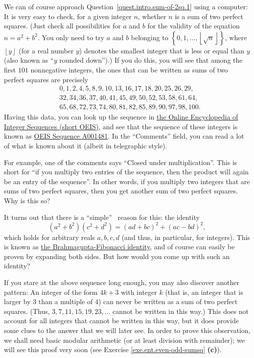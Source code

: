 \documentclass[numbers=enddot,12pt,final,onecolumn,notitlepage]{scrartcl}%
\numberwithin{exer}{subsection}
\theoremstyle{definition}
\begin{document}
We can of course approach Question~\ref{quest.intro.sum-of-2sq.1} using a
computer: It is very easy to check, for a given integer $n$, whether $n$ is a
sum of two perfect squares. (Just check all possibilities for $a$ and $b$ for
the validity of the equation $n = a^{2} + b^{2}$. You only need to try $a$ and
$b$ belonging to $\left\{  0, 1, \ldots, \left\lfloor \sqrt{n} \right\rfloor
\right\}  $, where $\left\lfloor y \right\rfloor $ (for a real number $y$)
denotes the smallest integer that is less or equal than $y$ (also known as
``$y$ rounded down'').) If you do this, you will see that among the first
$101$ nonnegative integers, the ones that can be written as sums of two
perfect squares are precisely
\begin{align*}
&  0, 1, 2, 4, 5, 8, 9, 10, 13, 16, 17, 18, 20, 25, 26, 29,\\
&  32, 34, 36, 37, 40, 41, 45, 49, 50, 52, 53, 58, 61, 64,\\
&  65, 68, 72, 73, 74, 80, 81, 82, 85, 89, 90, 97, 98, 100 .
\end{align*}
Having this data, you can look up the sequence in \href{https://oeis.org/}{the
Online Encyclopedia of Integer Sequences (short OEIS)}, and see that the
sequence of these integers is known as \href{https://oeis.org/A001481}{OEIS
Sequence A001481}. In the ``Comments'' field, you can read a lot of what is
known about it (albeit in telegraphic style).

For example, one of the comments says ``Closed under multiplication''. This is
short for ``if you multiply two entries of the sequence, then the product will
again be an entry of the sequence''. In other words, if you multiply two
integers that are sums of two perfect squares, then you get another sum of two
perfect squares. Why is this so?

It turns out that there is a \textquotedblleft simple\textquotedblright%
\ reason for this: the identity
\begin{equation}
\left(  a^{2}+b^{2}\right)  \left(  c^{2}+d^{2}\right)  =\left(  ad+bc\right)
^{2}+\left(  ac-bd\right)  ^{2}, \label{eq.intro.sum-of-2sq.sum*sum}%
\end{equation}
which holds for arbitrary reals $a,b,c,d$ (and thus, in particular, for
integers). This is known as
\href{https://en.wikipedia.org/wiki/Brahmagupta-Fibonacci_identity}{the
Brahmagupta-Fibonacci identity}, and of course can easily be proven by
expanding both sides. But how would you come up with such an identity?

If you stare at the above sequence long enough, you may also discover another
pattern: An integer of the form $4k+3$ with integer $k$ (that is, an integer
that is larger by $3$ than a multiple of $4$) can never be written as a sum of
two perfect squares. (Thus, $3,7,11,15,19,23,\ldots$ cannot be written in this
way.) This does not account for all integers that cannot be written in this
way, but it does provide some clues to the answer that we will later see. In
order to prove this observation, we shall need basic modular arithmetic (or at
least division with remainder); we will see this proof very soon (see Exercise
\ref{exe.ent.even-odd-sumsq} \textbf{(c)}).
\end{document}
